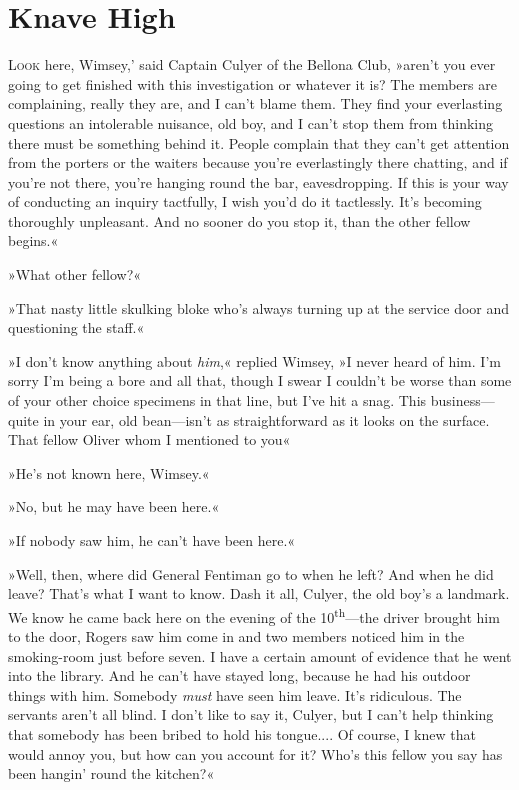 \chapter{Knave High}

\lettrine[lines=4,ante=‘]{L}{ook} here, Wimsey,' said Captain Culyer of the Bellona Club, »aren't you ever going to get finished with this investigation or whatever it is? The members are complaining, really they are, and I can't blame them. They find your everlasting questions an intolerable nuisance, old boy, and I can't stop them from thinking there must be something behind it. People complain that they can't get attention from the porters or the waiters because you're everlastingly there chatting, and if you're not there, you're hanging round the bar, eavesdropping. If this is your way of conducting an inquiry tactfully, I wish you'd do it tactlessly. It's becoming thoroughly unpleasant. And no sooner do you stop it, than the other fellow begins.«

»What other fellow?«

»That nasty little skulking bloke who's always turning up at the service door and questioning the staff.«

»I don't know anything about \textit{him},« replied Wimsey, »I never heard of him. I'm sorry I'm being a bore and all that, though I swear I couldn't be worse than some of your other choice specimens in that line, but I've hit a snag. This business\allowbreak---\allowbreak quite in your ear, old bean\allowbreak---\allowbreak isn't as straightforward as it looks on the surface. That fellow Oliver whom I mentioned to you\longdash«

»He's not known here, Wimsey.«

»No, but he may have been here.«

»If nobody saw him, he can't have been here.«

»Well, then, where did General Fentiman go to when he left? And when he did leave? That's what I want to know. Dash it all, Culyer, the old boy's a landmark. We know he came back here on the evening of the  10\textsuperscript{th}---the driver brought him to the door, Rogers saw him come in and two members noticed him in the smoking-room just before seven. I have a certain amount of evidence that he went into the library. And he can't have stayed long, because he had his outdoor things with him. Somebody \textit{must} have seen him leave. It's ridiculous. The servants aren't all blind. I don't like to say it, Culyer, but I can't help thinking that somebody has been bribed to hold his tongue.... Of course, I knew that would annoy you, but how can you account for it? Who's this fellow you say has been hangin' round the kitchen?«

